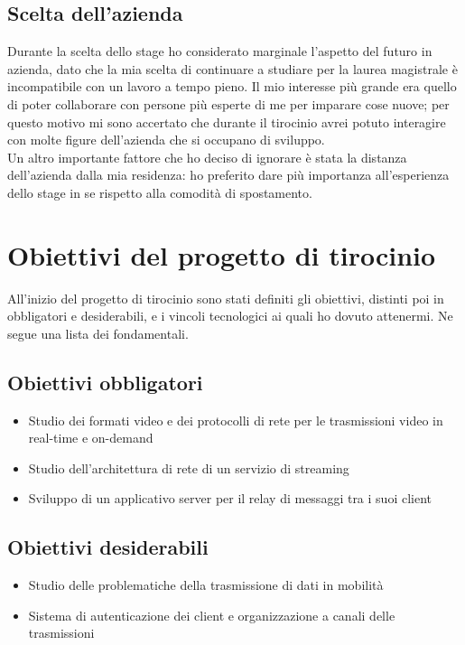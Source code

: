    \subsection{Scelta dell'azienda}
   Durante la scelta dello stage ho considerato marginale l'aspetto del futuro in azienda, dato che la mia scelta di continuare a studiare per la laurea magistrale è incompatibile con un lavoro a tempo pieno. Il mio interesse più grande era quello di poter collaborare con persone più esperte di me per imparare cose nuove; per questo motivo mi sono accertato che durante il tirocinio avrei potuto interagire con molte figure dell'azienda che si occupano di sviluppo.
   \\
   Un altro importante fattore che ho deciso di ignorare è stata la distanza dell'azienda dalla mia residenza: ho preferito dare più importanza all'esperienza dello stage in se rispetto alla comodità di spostamento.

\section{Obiettivi del progetto di tirocinio}
All'inizio del progetto di tirocinio sono stati definiti gli obiettivi, distinti poi in obbligatori e desiderabili, e i vincoli tecnologici ai quali ho dovuto attenermi. Ne segue una lista dei fondamentali.

   \subsection{Obiettivi obbligatori}
   \begin{itemize}
      \item{Studio dei formati video e dei protocolli di rete per le trasmissioni video in real-time e on-demand}
      \item{Studio dell'architettura di rete di un servizio di streaming}
      \item{Sviluppo di un applicativo server per il relay di messaggi tra i suoi client}
   \end{itemize}
      
   \subsection{Obiettivi desiderabili}
   \begin{itemize}
      \item{Studio delle problematiche della trasmissione di dati in mobilità}
      \item{Sistema di autenticazione dei client e organizzazione a canali delle trasmissioni}
   \end{itemize}

